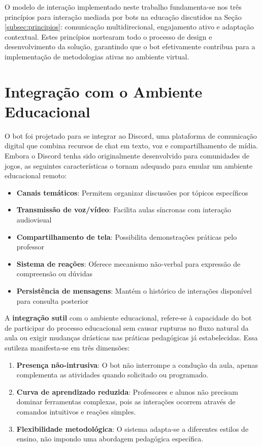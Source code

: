 O modelo de interação implementado neste trabalho fundamenta-se nos três princípios para interação mediada por bots na educação discutidos na Seção \ref{subsec:principios}: comunicação multidirecional, engajamento ativo e adaptação contextual. Estes princípios nortearam todo o processo de design e desenvolvimento da solução, garantindo que o bot efetivamente contribua para a implementação de metodologias ativas no ambiente virtual.


\section{Integração com o Ambiente Educacional}
\label{sec:integracao}

O bot foi projetado para se integrar ao Discord, uma plataforma de comunicação digital que combina recursos de chat em texto, voz e compartilhamento de mídia. Embora o Discord tenha sido originalmente desenvolvido para comunidades de jogos, as seguintes características o tornam adequado para emular um ambiente educacional remoto:

\begin{itemize}
\item \textbf{Canais temáticos}: Permitem organizar discussões por tópicos específicos
\item \textbf{Transmissão de voz/vídeo}: Facilita aulas síncronas com interação audiovisual
\item \textbf{Compartilhamento de tela}: Possibilita demonstrações práticas pelo professor
\item \textbf{Sistema de reações}: Oferece mecanismo não-verbal para expressão de compreensão ou dúvidas
\item \textbf{Persistência de mensagens}: Mantém o histórico de interações disponível para consulta posterior
\end{itemize}

A \textbf{integração sutil} com o ambiente educacional, refere-se à capacidade do bot de participar do processo educacional sem causar rupturas no fluxo natural da aula ou exigir mudanças drásticas nas práticas pedagógicas já estabelecidas. Essa sutileza manifesta-se em três dimensões:

\begin{enumerate}
\item \textbf{Presença não-intrusiva}: O bot não interrompe a condução da aula, apenas complementa as atividades quando solicitado ou programado.
\item \textbf{Curva de aprendizado reduzida}: Professores e alunos não precisam dominar ferramentas complexas, pois as interações ocorrem através de comandos intuitivos e reações simples.
\item \textbf{Flexibilidade metodológica}: O sistema adapta-se a diferentes estilos de ensino, não impondo uma abordagem pedagógica específica.
\end{enumerate}

